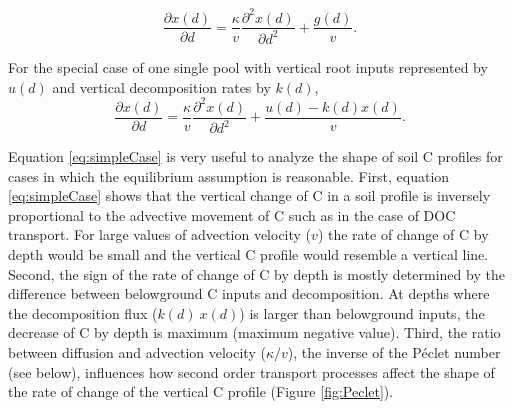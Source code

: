 \documentclass[11pt, oneside, a4paper]{article}   	%
\providecommand{\DIFaddbegin}{} %
\providecommand{\DIFaddend}{} %
\newcommand{\DIFaddincludegraphics}[2][]{{\color{blue}\fbox{\DIFOincludegraphics[#1]{#2}}}} %
\DeclareRobustCommand{\DIFaddbegin}{\DIFOaddbegin \let\includegraphics\DIFaddincludegraphics} %
\DeclareRobustCommand{\DIFaddend}{\DIFOaddend \let\includegraphics\DIFOincludegraphics} %
\begin{document}
\begin{equation} \DIFaddbegin \label{eq:firstDeriv}
\DIFaddend \frac{\partial x(d)}{\partial d} = \frac{\kappa}{v} \frac{\partial^2 x(d)}{\partial d^2} + \frac{g(d)}{v}.
\end{equation}

For the special case of one single pool with vertical root inputs represented by $u(d)$ and vertical decomposition rates by $k(d)$,
\begin{equation} \label{eq:simpleCase}
\frac{\partial x(d)}{\partial d} = \frac{\kappa}{v} \frac{\partial^2 x(d)}{\partial d^2} + \frac{u(d) - k(d) x(d)}{v}.
\end{equation}

Equation \ref{eq:simpleCase} is very useful to analyze the shape of soil C profiles for cases in which the equilibrium assumption is reasonable. 
First, equation \ref{eq:simpleCase} shows that the vertical change of C in a soil profile is inversely proportional to the advective movement of C such as in the case of DOC transport. For large values of advection velocity ($v$) the rate of change of C by depth would be small and the vertical C profile would resemble a vertical line. Second, the sign of the rate of change of C by depth is mostly determined by the difference between belowground C inputs and decomposition. At depths where the decomposition flux ($k(d) \ x(d)$) is larger than belowground inputs, the decrease of C by depth is maximum (maximum negative value). Third, the ratio between diffusion and advection velocity ($\kappa / v$), the inverse of the Péclet number (see below), influences how second order transport processes affect the shape of the rate of change of the vertical C profile (Figure \ref{fig:Peclet}). 
\end{document}
